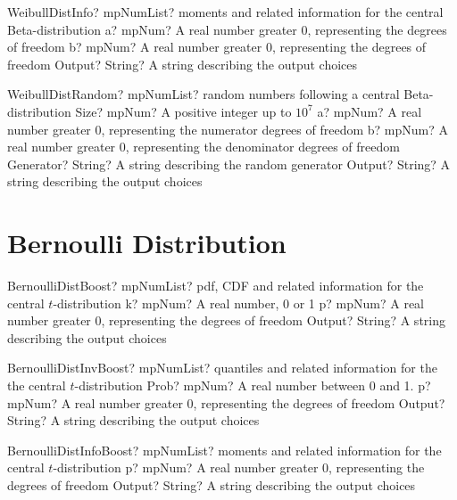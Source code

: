 \documentclass[12pt,a4paper,openany]{book}
\begin{document}
\begin{mpFunctionsExtract}
\mpFunctionThreeNotImplemented
{WeibullDistInfo? mpNumList? moments and related information for the central Beta-distribution}
{a? mpNum? A real number greater 0, representing the degrees of freedom}
{b? mpNum? A real number greater 0, representing the degrees of freedom}
{Output? String? A string describing the output choices}
\end{mpFunctionsExtract}

\begin{mpFunctionsExtract}
\mpFunctionFiveNotImplemented
{WeibullDistRandom? mpNumList? random numbers following a central Beta-distribution}
{Size? mpNum? A positive integer up to $10^7$}
{a? mpNum? A real number greater 0, representing the numerator  degrees of freedom}
{b? mpNum? A real number greater 0, representing the denominator degrees of freedom}
{Generator? String? A string describing the random generator}
{Output? String? A string describing the output choices}
\end{mpFunctionsExtract}

\section{Bernoulli Distribution}

\begin{mpFunctionsExtract}
\mpFunctionThreeNotImplemented
{BernoulliDistBoost? mpNumList? pdf, CDF and related information for the central $t$-distribution}
{k? mpNum? A real number, 0 or 1}
{p? mpNum? A real number greater 0, representing the degrees of freedom}
{Output? String? A string describing the output choices}
\end{mpFunctionsExtract}

\begin{mpFunctionsExtract}
\mpFunctionThreeNotImplemented
{BernoulliDistInvBoost? mpNumList? quantiles and related information for the the central $t$-distribution}
{Prob? mpNum? A real number between 0 and 1.}
{p? mpNum? A real number greater 0, representing the degrees of freedom}
{Output? String? A string describing the output choices}
\end{mpFunctionsExtract}

\begin{mpFunctionsExtract}
\mpFunctionTwoNotImplemented
{BernoulliDistInfoBoost? mpNumList? moments and related information for the central $t$-distribution}
{p? mpNum? A real number greater 0, representing the degrees of freedom}
{Output? String? A string describing the output choices}
\end{mpFunctionsExtract}
\end{document}
